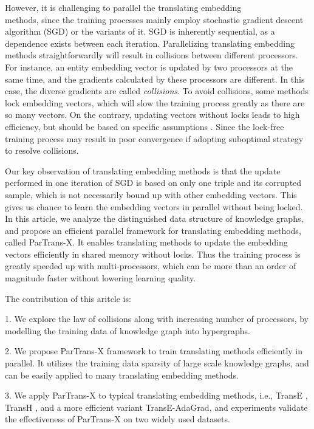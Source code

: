 \documentclass[sigconf]{acmart}
\begin{document}
However, it is challenging to parallel the translating embedding \\methods, since 
the training processes mainly employ stochastic gradient descent algorithm (SGD) or the variants of it. SGD is inherently sequential, as a dependence exists between each iteration.
Parallelizing translating embedding methods straightforwardly will result in collisions between different processors. For instance, an entity embedding vector is updated by two processors at the same time, and the gradients calculated by these processors are different. In this case, the diverse gradients are called \emph{collisions}. To avoid collisions, 
some methods \cite{Langford2009Slow} lock embedding vectors, which will slow the training process greatly as there are so many vectors. 
On the contrary, updating vectors without locks leads to high efficiency, but should be based on specific assumptions \cite{recht2011hogwild,Dean2012Large}. Since  the lock-free training process may result in poor convergence if adopting suboptimal strategy to resolve collisions. 


Our key observation of translating embedding methods is that  the update performed in one iteration of SGD is based on only one triple and its corrupted sample, which is not necessarily bound up with other embedding vectors. This gives us chance to learn the embedding vectors in parallel without being locked.
In this article, we analyze the distinguished data structure of knowledge graphs, and propose an efficient parallel framework for translating embedding methods, called ParTrans-X. It enables translating methods to update the embedding vectors efficiently in shared memory without locks. Thus the training process is greatly speeded up  with multi-processors, which can be more than an order of magnitude faster without lowering learning quality.

The contribution of this aritcle is:

1. We explore the law of collisions along with increasing number of processors, by modelling the training data of knowledge graph into hypergraphs.

2. We propose ParTrans-X framework to train translating methods efficiently in parallel. It utilizes the training data sparsity of large scale knowledge graphs, and can be easily applied to many translating embedding methods. 



3. We apply ParTrans-X to typical translating embedding methods, i.e., TransE \cite{bordes2013translating}, TransH \cite{Wang2014Knowledge}, and a more efficient variant TransE-AdaGrad, and experiments validate the effectiveness of ParTrans-X on two widely used datasets. 
\end{document}
